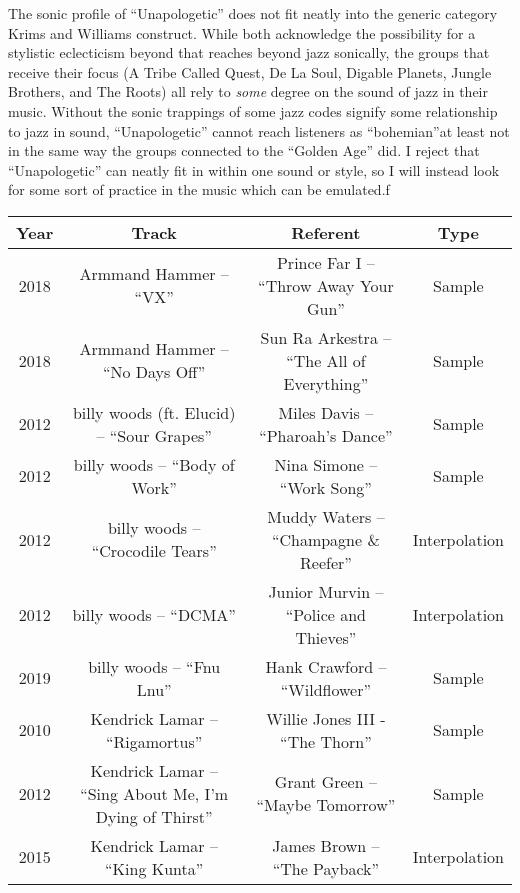 The sonic profile of ``Unapologetic'' does not fit neatly into the generic category Krims and Williams
construct. While both acknowledge the possibility for a stylistic eclecticism beyond that reaches beyond
jazz sonically, the groups that receive their focus (A Tribe Called Quest, De La Soul, Digable Planets, 
Jungle Brothers, and The Roots) all rely to \emph{some} degree on the sound of jazz in their music. 
Without the sonic trappings of some jazz codes signify some relationship to jazz in sound, 
``Unapologetic'' cannot reach listeners as ``bohemian''\textemdash at least not in the same way 
the groups connected to the ``Golden Age'' did. I reject that ``Unapologetic'' can neatly
fit in within one sound or style, so I will instead look for some sort of practice in the music
which can be emulated.f

\begin{sidewaystable}[p]
    \centering
    \small
    \begin{tabular}{|c|c|c|c|}
         \hline
        Year & Track & Referent & Type \\ \hline
        2018 & Armmand Hammer -- ``VX'' & Prince Far I -- ``Throw Away Your Gun'' & Sample \\ \hline
        2018 & Armmand Hammer -- ``No Days Off'' & Sun Ra Arkestra -- ``The All of Everything'' & Sample \\ \hline
        2012 & billy woods (ft. Elucid) -- ``Sour Grapes'' & Miles Davis -- ``Pharoah's Dance'' & Sample \\ \hline
        2012 & billy woods -- ``Body of Work'' & Nina Simone -- ``Work Song'' & Sample \\ \hline
        2012 & billy woods -- ``Crocodile Tears'' & Muddy Waters -- ``Champagne \& Reefer'' & Interpolation \\ \hline
        2012 & billy woods -- ``DCMA'' & Junior Murvin -- ``Police and Thieves'' & Interpolation \\ \hline
        2019 & billy woods -- ``Fnu Lnu'' & Hank Crawford -- ``Wildflower'' & Sample \\ \hline
        2010 & Kendrick Lamar -- ``Rigamortus'' & Willie Jones III - ``The Thorn'' & Sample \\ \hline 
        2012 & Kendrick Lamar -- ``Sing About Me, I'm Dying of Thirst'' & Grant Green -- ``Maybe Tomorrow'' & Sample \\ \hline
        2015 & Kendrick Lamar -- ``King Kunta'' & James Brown -- ``The Payback'' & Interpolation \\ \hline

\end{tabular}
\end{sidewaystable}
